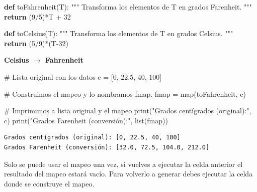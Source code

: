 \documentclass[
  spanish,
  letterpaper,
]{scrbook}
\newenvironment{Shaded}{\begin{snugshade}}{\end{snugshade}}
\newcommand{\BuiltInTok}[1]{\textcolor[rgb]{0.00,0.23,0.31}{#1}}
\newcommand{\CommentTok}[1]{\textcolor[rgb]{0.37,0.37,0.37}{#1}}
\newcommand{\ControlFlowTok}[1]{\textcolor[rgb]{0.00,0.23,0.31}{\textbf{#1}}}
\newcommand{\DecValTok}[1]{\textcolor[rgb]{0.68,0.00,0.00}{#1}}
\newcommand{\FloatTok}[1]{\textcolor[rgb]{0.68,0.00,0.00}{#1}}
\newcommand{\KeywordTok}[1]{\textcolor[rgb]{0.00,0.23,0.31}{\textbf{#1}}}
\newcommand{\NormalTok}[1]{\textcolor[rgb]{0.00,0.23,0.31}{#1}}
\newcommand{\OperatorTok}[1]{\textcolor[rgb]{0.37,0.37,0.37}{#1}}
\newcommand{\StringTok}[1]{\textcolor[rgb]{0.13,0.47,0.30}{#1}}
\theoremstyle{definition}
\theoremstyle{remark}
\begin{document}
\begin{Shaded}
\begin{Highlighting}[]
\KeywordTok{def}\NormalTok{ toFahrenheit(T):}
    \CommentTok{"""}
\CommentTok{    Transforma los elementos de T en grados Farenheit.}
\CommentTok{    """}
    \ControlFlowTok{return}\NormalTok{ (}\DecValTok{9}\OperatorTok{/}\DecValTok{5}\NormalTok{)}\OperatorTok{*}\NormalTok{T }\OperatorTok{+} \DecValTok{32}

\KeywordTok{def}\NormalTok{ toCelsius(T):}
    \CommentTok{"""}
\CommentTok{    Transforma los elementos de T en grados Celsius.}
\CommentTok{    """}
    \ControlFlowTok{return}\NormalTok{ (}\DecValTok{5}\OperatorTok{/}\DecValTok{9}\NormalTok{)}\OperatorTok{*}\NormalTok{(T}\OperatorTok{{-}}\DecValTok{32}\NormalTok{)}
\end{Highlighting}
\end{Shaded}

\textbf{Celsius \(\to\) Fahrenheit}

\begin{Shaded}
\begin{Highlighting}[]
\CommentTok{\# Lista original con los datos}
\NormalTok{c }\OperatorTok{=}\NormalTok{ [}\DecValTok{0}\NormalTok{, }\FloatTok{22.5}\NormalTok{, }\DecValTok{40}\NormalTok{, }\DecValTok{100}\NormalTok{]}

\CommentTok{\# Construimos el mapeo y lo nombramos \textasciigrave{}fmap\textasciigrave{}.}
\NormalTok{fmap }\OperatorTok{=} \BuiltInTok{map}\NormalTok{(toFahrenheit, c)}
\end{Highlighting}
\end{Shaded}

\begin{Shaded}
\begin{Highlighting}[]
\CommentTok{\# Imprimimos a lista original y el mapeo}
\BuiltInTok{print}\NormalTok{(}\StringTok{"Grados centígrados (original):"}\NormalTok{, c)}
\BuiltInTok{print}\NormalTok{(}\StringTok{"Grados Farenheit (conversión):"}\NormalTok{, }\BuiltInTok{list}\NormalTok{(fmap))}
\end{Highlighting}
\end{Shaded}

\begin{verbatim}
Grados centígrados (original): [0, 22.5, 40, 100]
Grados Farenheit (conversión): [32.0, 72.5, 104.0, 212.0]
\end{verbatim}

\begin{tcolorbox}[enhanced jigsaw, colframe=quarto-callout-note-color-frame, opacityback=0, toprule=.15mm, colback=white, coltitle=black, leftrule=.75mm, arc=.35mm, breakable, left=2mm, bottomtitle=1mm, rightrule=.15mm, bottomrule=.15mm, colbacktitle=quarto-callout-note-color!10!white, toptitle=1mm, titlerule=0mm, opacitybacktitle=0.6, title=\textcolor{quarto-callout-note-color}{\faInfo}\hspace{0.5em}{Nota.}]

Solo se puede usar el mapeo una vez, si vuelves a ejecutar la celda
anterior el resultado del mapeo estará vacío. Para volverlo a generar
debes ejecutar la celda donde se construye el mapeo.

\end{tcolorbox}
\end{document}
